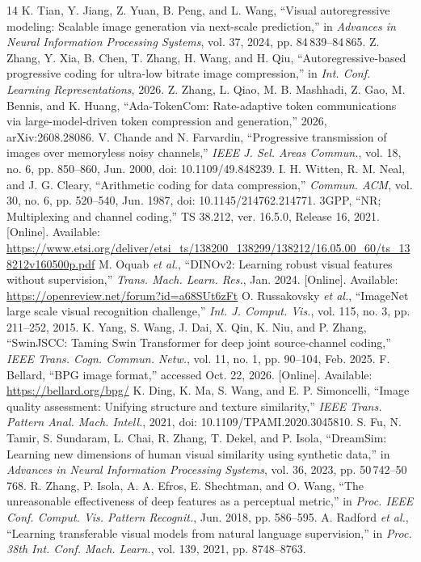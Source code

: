 \begin{thebibliography}{14}
 K. Tian, Y. Jiang, Z. Yuan, B. Peng, and L. Wang, ``Visual autoregressive modeling: Scalable image generation via next-scale prediction,'' in \emph{Advances in Neural Information Processing Systems}, vol. 37, 2024, pp. 84\,839--84\,865.
 Z. Zhang, Y. Xia, B. Chen, T. Zhang, H. Wang, and H. Qiu, ``Autoregressive-based progressive coding for ultra-low bitrate image compression,'' in \emph{Int. Conf. Learning Representations}, 2026.
 Z. Zhang, L. Qiao, M. B. Mashhadi, Z. Gao, M. Bennis, and K. Huang, ``Ada-TokenCom: Rate-adaptive token communications via large-model-driven token compression and generation,'' 2026, arXiv:2608.28086.
 V. Chande and N. Farvardin, ``Progressive transmission of images over memoryless noisy channels,'' \emph{IEEE J. Sel. Areas Commun.}, vol. 18, no. 6, pp. 850--860, Jun. 2000, doi: 10.1109/49.848239.
 I. H. Witten, R. M. Neal, and J. G. Cleary, ``Arithmetic coding for data compression,'' \emph{Commun. ACM}, vol. 30, no. 6, pp. 520--540, Jun. 1987, doi: 10.1145/214762.214771.
 3GPP, ``NR; Multiplexing and channel coding,'' TS 38.212, ver. 16.5.0, Release 16, 2021. [Online]. Available: \url{https://www.etsi.org/deliver/etsi_ts/138200_138299/138212/16.05.00_60/ts_138212v160500p.pdf}
 M. Oquab \emph{et al.}, ``DINOv2: Learning robust visual features without supervision,'' \emph{Trans. Mach. Learn. Res.}, Jan. 2024. [Online]. Available: \url{https://openreview.net/forum?id=a68SUt6zFt}
 O. Russakovsky \emph{et al.}, ``ImageNet large scale visual recognition challenge,'' \emph{Int. J. Comput. Vis.}, vol. 115, no. 3, pp. 211--252, 2015.
 K. Yang, S. Wang, J. Dai, X. Qin, K. Niu, and P. Zhang, ``SwinJSCC: Taming Swin Transformer for deep joint source-channel coding,'' \emph{IEEE Trans. Cogn. Commun. Netw.}, vol. 11, no. 1, pp. 90--104, Feb. 2025.
 F. Bellard, ``BPG image format,'' accessed Oct. 22, 2026. [Online]. Available: \url{https://bellard.org/bpg/}
 K. Ding, K. Ma, S. Wang, and E. P. Simoncelli, ``Image quality assessment: Unifying structure and texture similarity,'' \emph{IEEE Trans. Pattern Anal. Mach. Intell.}, 2021, doi: 10.1109/TPAMI.2020.3045810.
 S. Fu, N. Tamir, S. Sundaram, L. Chai, R. Zhang, T. Dekel, and P. Isola, ``DreamSim: Learning new dimensions of human visual similarity using synthetic data,'' in \emph{Advances in Neural Information Processing Systems}, vol. 36, 2023, pp. 50\,742--50\,768.
 R. Zhang, P. Isola, A. A. Efros, E. Shechtman, and O. Wang, ``The unreasonable effectiveness of deep features as a perceptual metric,'' in \emph{Proc. IEEE Conf. Comput. Vis. Pattern Recognit.}, Jun. 2018, pp. 586--595.
 A. Radford \emph{et al.}, ``Learning transferable visual models from natural language supervision,'' in \emph{Proc. 38th Int. Conf. Mach. Learn.}, vol. 139, 2021, pp. 8748--8763.
\end{thebibliography}
